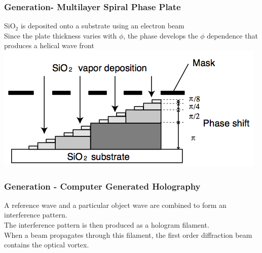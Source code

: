 \documentclass[]{beamer}
\title{}
\author{Paho Lurie-Gregg}
\date{}
\begin{document}
\begin{frame}
	\frametitle{Generation-  Multilayer Spiral Phase Plate}
	SiO$_2$ is deposited onto a substrate using an electron beam
	\\Since the plate thickness varies with $\phi$, the phase develops the $\phi$ dependence that produces a helical wave front
	\\\centering
	\includegraphics[scale=.4]{MSPP.jpg}
	\\\cite{MSPP}
\end{frame}

\begin{frame}
	\frametitle{Generation - Computer Generated Holography}
	A reference wave and a particular object wave are combined to form an interference pattern.
	\\The interference pattern is then produced as a hologram filament. 
	\\ When a beam propagates through this filament, the first order diffraction beam contains the optical vortex.
\end{frame}


\end{document}
